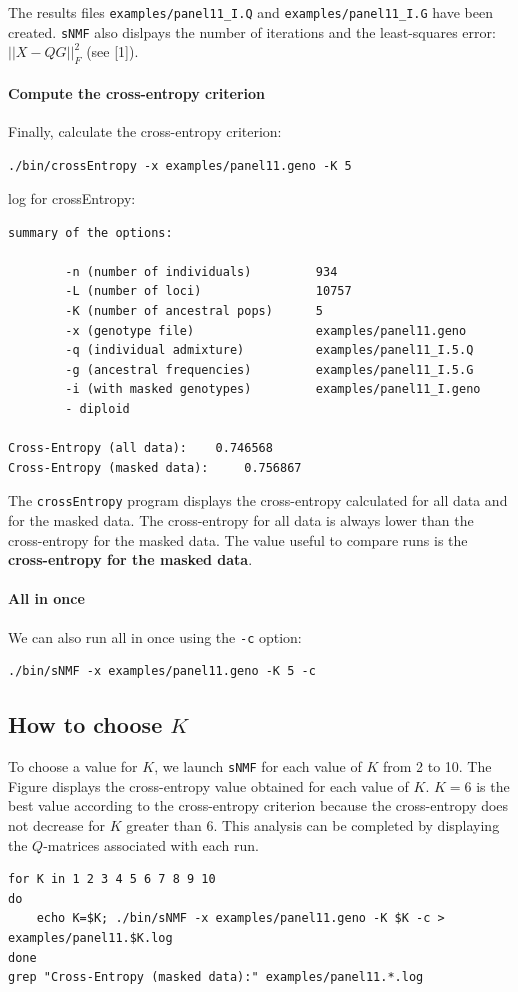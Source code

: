 \documentclass[10pt,a4paper]{article}
\begin{document}
\noindent
The results files \verb|examples/panel11_I.Q| and \verb|examples/panel11_I.G| have been created.
{\tt sNMF} also dislpays the number of iterations and the least-squares error: $||X - QG||_F^2$
(see [1]).

\paragraph{Compute the cross-entropy criterion}

Finally, calculate the cross-entropy criterion:
\begin{Verbatim}[frame=single]
./bin/crossEntropy -x examples/panel11.geno -K 5
\end{Verbatim}
\noindent
log for crossEntropy:
\begin{Verbatim}[frame=single]
summary of the options:

        -n (number of individuals)         934
        -L (number of loci)                10757
        -K (number of ancestral pops)      5
        -x (genotype file)                 examples/panel11.geno
        -q (individual admixture)          examples/panel11_I.5.Q
        -g (ancestral frequencies)         examples/panel11_I.5.G
        -i (with masked genotypes)         examples/panel11_I.geno
        - diploid

Cross-Entropy (all data):	 0.746568
Cross-Entropy (masked data):	 0.756867
\end{Verbatim}
\noindent
The {\tt crossEntropy} program displays the cross-entropy calculated for all data and for the masked data.
The cross-entropy for all data is always lower than the cross-entropy for the masked data. 
The value useful to compare runs is the {\bf cross-entropy for the masked data}.


\paragraph{All in once}
We can also run all in once using the \verb|-c| option:
\begin{Verbatim}[frame=single]
./bin/sNMF -x examples/panel11.geno -K 5 -c
\end{Verbatim}

\subsection{How to choose $K$}

To choose a value for $K$, we launch {\tt sNMF} for each value of $K$ from 2 to 10. The Figure displays the cross-entropy value obtained for each value of $K$. $K=6$ is the best value according to the cross-entropy criterion because the cross-entropy does not decrease for $K$ greater than 6. This analysis can be completed by displaying the $Q$-matrices associated with each run. 
\begin{Verbatim}[frame=single]
for K in 1 2 3 4 5 6 7 8 9 10 
do 
	echo K=$K; ./bin/sNMF -x examples/panel11.geno -K $K -c > examples/panel11.$K.log
done
grep "Cross-Entropy (masked data):" examples/panel11.*.log
\end{Verbatim}
\end{document}
